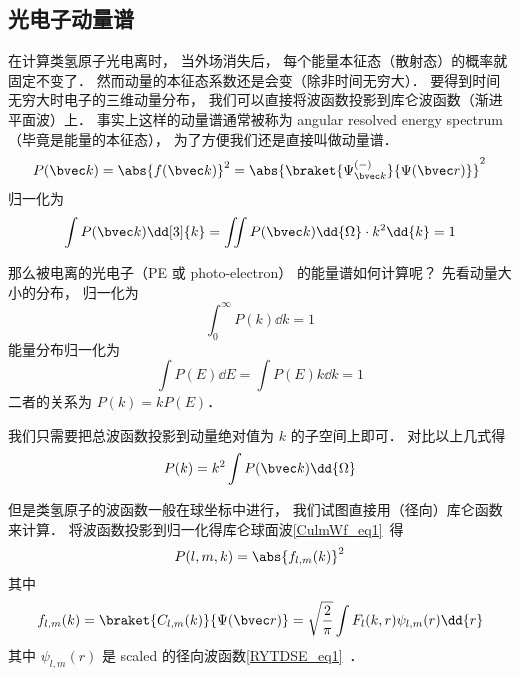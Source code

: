 

\subsection{光电子动量谱}

在计算类氢原子光电离时， 当外场消失后， 每个能量本征态（散射态）的概率就固定不变了． 然而动量的本征态系数还是会变（除非时间无穷大）． 要得到时间无穷大时电子的三维动量分布， 我们可以直接将波函数投影到库仑波函数（渐进平面波）上． 事实上这样的动量谱通常被称为 angular resolved energy spectrum （毕竟是能量的本征态）， 为了方便我们还是直接叫做动量谱．
\begin{equation}
P(\bvec k) = \abs{f(\bvec k)}^2 = \abs{\braket{\Psi^{(-)}_{\bvec k}}{\Psi(\bvec r)}}^2
\end{equation}
归一化为
\begin{equation}
\int P(\bvec k) \dd[3]{k} = \iint P(\bvec k) \dd{\Omega} \cdot k^2\dd{k} = 1
\end{equation}

那么被电离的光电子（PE 或 photo-electron） 的能量谱如何计算呢？ 先看动量大小的分布， 归一化为
\begin{equation}\label{Hanaly_eq2}
\int_0^\infty P(k) \dd{k} = 1
\end{equation}
能量分布归一化为
\begin{equation}\label{Hanaly_eq1}
\int P(E) \dd{E} = \int P(E) k\dd{k} = 1
\end{equation}
二者的关系为 $P(k) = kP(E)$．

我们只需要把总波函数投影到动量绝对值为 $k$ 的子空间上即可． 对比以上几式得
\begin{equation}
P(k) = k^2 \int P(\bvec k) \dd{\Omega}
\end{equation}

但是类氢原子的波函数一般在球坐标中进行， 我们试图直接用（径向）库仑函数来计算． 将波函数投影到归一化得库仑球面波\autoref{CulmWf_eq1}~得
\begin{equation}
P(l, m, k) = \abs{f_{l,m}(k)}^2 
\end{equation}
其中
\begin{equation}
f_{l,m}(k) = \braket{C_{l,m}(k)}{\Psi(\bvec r)} = \sqrt{\frac{2}{\pi}} \int F_l(k, r) \psi_{l,m}(r) \dd{r}
\end{equation}
其中 $\psi_{l,m}(r)$ 是 scaled 的径向波函数\autoref{RYTDSE_eq1}~．

